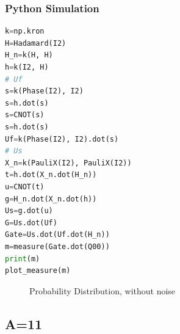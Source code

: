 \documentclass{article}
\begin{document}
\subsubsection{Python Simulation}
\begin{lstlisting}[frame=single, language=Python]
k=np.kron
H=Hadamard(I2)
H_n=k(H, H)
h=k(I2, H)
# Uf
s=k(Phase(I2), I2)
s=h.dot(s)
s=CNOT(s)
s=h.dot(s)
Uf=k(Phase(I2), I2).dot(s)
# Us
X_n=k(PauliX(I2), PauliX(I2))
t=h.dot(X_n.dot(H_n))
u=CNOT(t)
g=H_n.dot(X_n.dot(h))
Us=g.dot(u)
G=Us.dot(Uf)
Gate=Us.dot(Uf.dot(H_n))
m=measure(Gate.dot(Q00))
print(m)
plot_measure(m)
\end{lstlisting}
\begin{figure}[H]
\centering 
\noindent{}%
\caption{Probability Distribution, without noise}
\end{figure}
\subsection{A=11}
\end{document}
